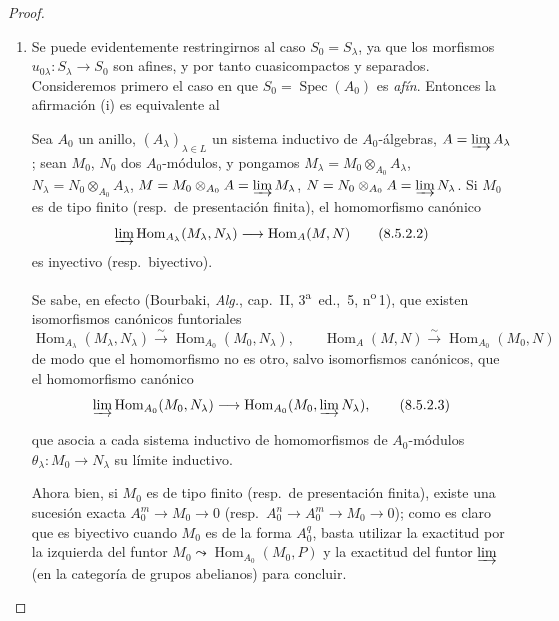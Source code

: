 \begin{proof}
\begin{enumerate}[label=(\roman*)]
  \item Se puede evidentemente restringirnos al caso $S_0=S_\lambda$, ya que los morfismos $u_{0\lambda}:S_\lambda\to S_0$ son afines, y por tanto cuasicompactos y separados.
Consideremos primero el caso en que $S_0=\operatorname{Spec}(A_0)$ es \emph{afín}.
Entonces la afirmación (i) es equivalente al

\begin{lemma}[8.5.2.1]
\label{IV.8.5.2.1-fr}
Sea $A_0$ un anillo, $(A_\lambda)_{\lambda\in L}$ un sistema inductivo de $A_0$-álgebras, $A=\varinjlim A_\lambda$; sean $M_0$, $N_0$ dos $A_0$-módulos, y pongamos $M_\lambda=M_0\otimes_{A_0}A_\lambda$, $N_\lambda=N_0\otimes_{A_0}A_\lambda$, $M=M_0\otimes_{A_0}A=\varinjlim M_\lambda$, $N=N_0\otimes_{A_0}A=\varinjlim N_\lambda$.
Si $M_0$ es de tipo finito (\textup{resp.}\ de presentación finita), el homomorfismo canónico
\begin{equation}
    \varinjlim\operatorname{Hom}_{A_\lambda}(M_\lambda,N_\lambda)
    \longrightarrow\operatorname{Hom}_A(M,N)
    \tag{8.5.2.2}\label{IV.8.5.2.2-fr}
  \end{equation}
es inyectivo (\textup{resp.}\ biyectivo).
\end{lemma}

Se sabe, en efecto (Bourbaki, \emph{Alg.}, cap.~II, 3\textsuperscript{a}~ed., \textsection\,5, n\textsuperscript{o}\,1), que existen isomorfismos canónicos funtoriales
\[
    \operatorname{Hom}_{A_\lambda}(M_\lambda,N_\lambda)
    \xrightarrow{\sim}\operatorname{Hom}_{A_0}(M_0,N_\lambda),
    \qquad
    \operatorname{Hom}_A(M,N)
    \xrightarrow{\sim}\operatorname{Hom}_{A_0}(M_0,N)
  \]
de modo que el homomorfismo  no es otro, salvo isomorfismos canónicos, que el homomorfismo canónico
\begin{equation}
    \varinjlim\operatorname{Hom}_{A_0}(M_0,N_\lambda)
    \longrightarrow
    \operatorname{Hom}_{A_0}(M_0,\varinjlim N_\lambda),
    \tag{8.5.2.3}\label{IV.8.5.2.3-fr}
  \end{equation}

que asocia a cada sistema inductivo de homomorfismos de $A_0$-módulos $\theta_\lambda:M_0\to N_\lambda$ su límite inductivo.

Ahora bien, si $M_0$ es de tipo finito (resp.\ de presentación finita), existe una sucesión exacta $A_0^m\to M_0\to0$ (resp.\ $A_0^n\to A_0^m\to M_0\to0$); como es claro que  es biyectivo cuando $M_0$ es de la forma $A_0^q$, basta utilizar la exactitud por la izquierda del funtor $M_0\leadsto\operatorname{Hom}_{A_0}(M_0,P)$ y la exactitud del funtor $\varinjlim$ (en la categoría de grupos abelianos) para concluir.


\end{enumerate}
\end{proof}
